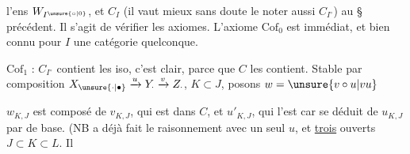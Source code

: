 
 l'ens $W_{I^{\unsure{\circ|0}}}$, et $C_I$ (il vaut mieux sans doute le noter aussi $C_{I^\circ}$)  au \S{} précédent. Il s'agit de vérifier les axiomes. L'axiome $\mathrm{Cof}_0$ est immédiat, et bien connu pour $I$ une catégorie quelconque.

$\mathrm{Cof}_1$ : $C_{I^\circ}$ contient les iso, c'est clair, parce que $C$ les contient. Stable par composition $X_{\unsure{\cdot|\bullet}}\xrightarrow{u}Y_{\cdot}\xrightarrow{v}Z_{\cdot}$,  $K\subset J$, posons $w=\unsure{v\circ u|vu}$


$w_{K,J}$ est composé de $v_{K,J}$, qui est dans $C$, et $u'_{K,J}$, qui l'est car se déduit de $u_{K,J}$ par  de base. (NB  a déjà fait le raisonnement avec un seul $u$, et \uline{trois} ouverts $J\subset K\subset L$. Il
